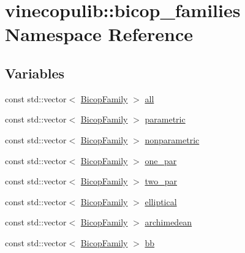 \hypertarget{namespacevinecopulib_1_1bicop__families}{}\section{vinecopulib\+:\+:bicop\+\_\+families Namespace Reference}
\label{namespacevinecopulib_1_1bicop__families}
\subsection*{Variables}
\begin{DoxyCompactItemize}
\item 
const std\+::vector$<$ \hyperlink{namespacevinecopulib_a42e95cc06d33896199caab0c11ad44f3}{Bicop\+Family} $>$ \hyperlink{namespacevinecopulib_1_1bicop__families_a5214a513f41ec23b74782aab96ea6774}{all}
\item 
const std\+::vector$<$ \hyperlink{namespacevinecopulib_a42e95cc06d33896199caab0c11ad44f3}{Bicop\+Family} $>$ \hyperlink{namespacevinecopulib_1_1bicop__families_a76d66bb6cb03ae4de1cef3d1ed70ac16}{parametric}
\item 
const std\+::vector$<$ \hyperlink{namespacevinecopulib_a42e95cc06d33896199caab0c11ad44f3}{Bicop\+Family} $>$ \hyperlink{namespacevinecopulib_1_1bicop__families_a01c7c990cc34b1b74d115858a52fcdc5}{nonparametric}
\item 
const std\+::vector$<$ \hyperlink{namespacevinecopulib_a42e95cc06d33896199caab0c11ad44f3}{Bicop\+Family} $>$ \hyperlink{namespacevinecopulib_1_1bicop__families_aba503484b0a13cfb0e67c026e2f295d4}{one\+\_\+par}
\item 
const std\+::vector$<$ \hyperlink{namespacevinecopulib_a42e95cc06d33896199caab0c11ad44f3}{Bicop\+Family} $>$ \hyperlink{namespacevinecopulib_1_1bicop__families_ad5871c39b4ee62bd44fa851d7d70c7ca}{two\+\_\+par}
\item 
const std\+::vector$<$ \hyperlink{namespacevinecopulib_a42e95cc06d33896199caab0c11ad44f3}{Bicop\+Family} $>$ \hyperlink{namespacevinecopulib_1_1bicop__families_a24b790671c9f4b25e57ecbc3505232fb}{elliptical}
\item 
const std\+::vector$<$ \hyperlink{namespacevinecopulib_a42e95cc06d33896199caab0c11ad44f3}{Bicop\+Family} $>$ \hyperlink{namespacevinecopulib_1_1bicop__families_a714863b69ae59ac48c7fb2be45cd2619}{archimedean}
\item 
const std\+::vector$<$ \hyperlink{namespacevinecopulib_a42e95cc06d33896199caab0c11ad44f3}{Bicop\+Family} $>$ \hyperlink{namespacevinecopulib_1_1bicop__families_a1cb66138467920882f9c37611553aa34}{bb}

\end{DoxyCompactItemize}
